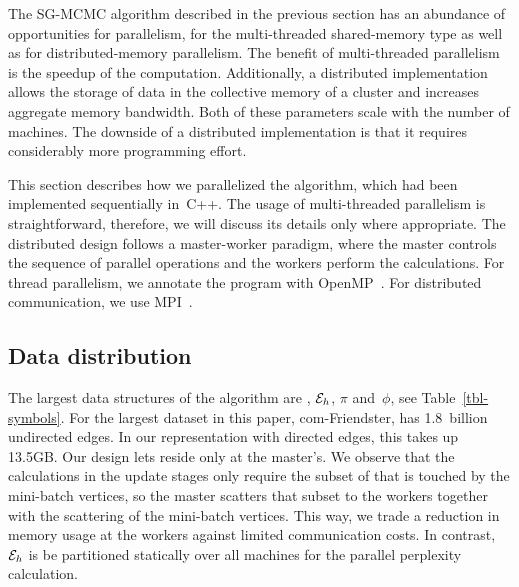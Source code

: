 \begin{comment}
- pi storage: DKV
   . pi/phi is read in 3), 4), 5a), 7)
   . pi is written in 4); read[i], then write[i], so no other data dependencies
   . so access is very synchronous: either read-only, or write without
     concurrent readers
   . DKV store properties:
      - single-sized keys
      - contiguous key space (integers 0..N-1)
      - update-only writes: no new KVs, no deletes
     so: no load imbalance, no hashing that is worth its name
      - no read/write or write/write concurrency
     so:
      - build RDMA store with remote reads and remote writes only, with exactly
        one RDMA transaction per read or write
\end{comment}



The SG-MCMC algorithm described in the previous section has an abundance of
opportunities for parallelism, for the multi-threaded shared-memory type as
well as for distributed-memory parallelism. The benefit of multi-threaded
parallelism is the speedup of the computation. Additionally, a distributed implementation
allows the storage of data in the collective memory of a cluster
and increases aggregate memory bandwidth. Both of these parameters scale with the number of
machines. The downside of a distributed implementation is that it requires
considerably more programming effort.


This section describes how we parallelized the algorithm, which had been
implemented sequentially in~C++.
The usage of multi-threaded parallelism
is straightforward, therefore, we will discuss its details only where appropriate. The
distributed design follows a master-worker paradigm, where
the master controls the sequence of parallel operations and the workers perform the
calculations. For thread parallelism, we annotate the program with
OpenMP~\cite{OpenMPSpec}. For distributed communication, we use
MPI~\cite{Forum:1994:MMI:898758}.


\subsection{Data distribution}


The largest data structures of the algorithm are \Edges, $\cE_h$, $\pi$
and~$\phi$, see Table~\ref{tbl-symbols}.
For the largest dataset in this paper, com-Friendster, \Edges has 1.8~billion
undirected edges. In our representation with directed edges, this takes
up 13.5GB. Our design lets \Edges reside only at the master's. We observe that
the calculations in the update stages only require the subset of \Edges that
is touched by the mini-batch vertices, so the master scatters that subset to
the workers together with the scattering of the mini-batch vertices. This way,
we trade a reduction in memory usage at the workers against limited
communication costs. In contrast, $\cE_h$ is be partitioned statically over
all machines for the parallel perplexity calculation.

